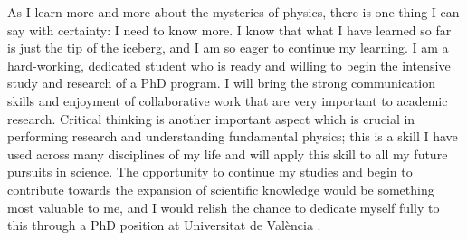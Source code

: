 \documentclass[11pt, a4paper]{awesome-cv}
\newcommand\uni{Universitat de Val\`{e}ncia }
\begin{document}
\begin{cvletter}
As I learn more and more about the mysteries of physics, there is one thing I can say with certainty: I need to know more. 
I know that what I have learned so far is just the tip of the iceberg, and I am so eager to continue my learning. 
I am a hard-working, dedicated student who is ready and willing to begin the intensive study and research of a PhD program. 
I will bring the strong communication skills and enjoyment of collaborative work that are very important to academic research. 
Critical thinking is another important aspect which is crucial in performing research and understanding fundamental physics; this is a skill I have used across many disciplines of my life and will apply this skill to all my future pursuits in science.
The opportunity to continue my studies and begin to contribute towards the expansion of scientific knowledge would be something most valuable to me, and I would relish the chance to dedicate myself fully to this through a PhD position at \uni. 

\end{cvletter}

\makeletterclosing
\end{document}
